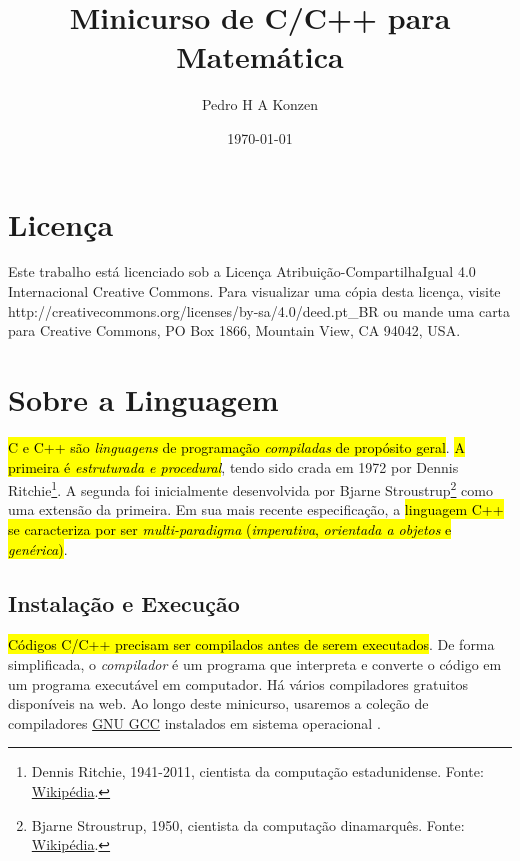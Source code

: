 \documentclass[12pt]{article}
\begin{document}
\title{Minicurso de C/C++ para Matemática}
\author{Pedro H A Konzen}
\date{\today}

\maketitle

\nocite{}

\tableofcontents

\section{Licença}\label{sec_licenca}

Este trabalho está licenciado sob a Licença Atribuição-CompartilhaIgual 4.0 Internacional Creative Commons. Para visualizar uma cópia desta licença, visite http://creativecommons.org/licenses/by-sa/4.0/deed.pt\_BR ou mande uma carta para Creative Commons, PO Box 1866, Mountain View, CA 94042, USA.


\section{Sobre a Linguagem}\label{sec_sobrepy}

\hl{C e C++ são \emph{linguagens} de programação \emph{compiladas} de propósito geral}. \hl{A primeira é \emph{estruturada e procedural}}, tendo sido crada em 1972 por Dennis Ritchie\footnote{Dennis Ritchie, 1941-2011, cientista da computação estadunidense. Fonte: \href{https://pt.wikipedia.org/wiki/Dennis_Ritchie}{Wikipédia}.}. A segunda foi inicialmente desenvolvida por Bjarne Stroustrup\footnote{Bjarne Stroustrup, 1950, cientista da computação dinamarquês. Fonte: \href{https://pt.wikipedia.org/wiki/Bjarne_Stroustrup}{Wikipédia}.} como uma extensão da primeira. Em sua mais recente especificação, a \hl{linguagem C++ se caracteriza por ser \emph{multi-paradigma} (\emph{imperativa}, \emph{orientada a objetos} e \emph{genérica})}.

\subsection{Instalação e Execução}

\hl{Códigos C/C++ precisam ser compilados antes de serem executados}. De forma simplificada, o \emph{compilador} é um programa que interpreta e converte o código em um programa executável em computador. Há vários compiladores gratuitos disponíveis na web. Ao longo deste minicurso, usaremos a coleção de compiladores \href{https://gcc.gnu.org/}{GNU GCC} instalados em sistema operacional {\linux}.
\end{document}
